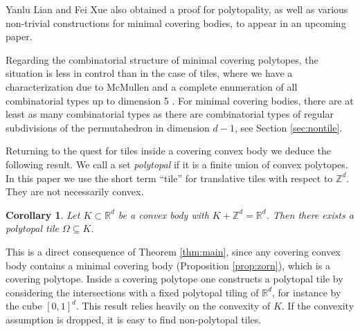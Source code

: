 \documentclass[11pt, a4paper]{amsart}
\newcommand{\RR}{\mathbb{R}}
\newcommand{\ZZ}{\mathbb{Z}}
\numberwithin{equation}{section}
\theoremstyle{plain}
\newtheorem{corollary}[theorem]{Corollary}
\begin{document}
Yanlu Lian and Fei Xue also obtained a proof for polytopality, as well as various non-trivial constructions for minimal covering bodies, to appear in an upcoming paper.

Regarding the combinatorial structure of minimal covering polytopes, the situation is less in control than in the case of tiles, where we have a characterization due to McMullen \cite{mcmullen} and a complete enumeration of all combinatorial types up to dimension 5 \cite{vor5,garber}. For minimal covering bodies, there are at least as many combinatorial types as there are combinatorial types of regular subdivisions of the permutahedron in dimension $d-1$, see Section \ref{sec:nontile}. 

Returning to the quest for tiles inside a covering convex body we deduce the following result. We call a set \emph{polytopal} if it is a finite union of convex polytopes. In this paper we use the short term ``tile'' for translative tiles with respect to $\ZZ^d$. They are not necessarily convex.

\begin{corollary}
Let $K\subset\RR^d$ be a convex body with $K+\ZZ^d = \RR^d$. Then there exists a polytopal tile $\Omega\subseteq K$.
\end{corollary}

This is a direct consequence of Theorem \ref{thm:main}, since any covering convex body contains a minimal covering body (Proposition \ref{prop:zorn}), which is a covering polytope. Inside a covering polytope one constructs a polytopal tile by considering the intersections with a fixed polytopal tiling of $\RR^d$, for instance by the cube $[0,1]^d$. 
This result relies heavily on the convexity of $K$. If the convexity assumption is dropped, it is easy to find non-polytopal tiles.
\end{document}

